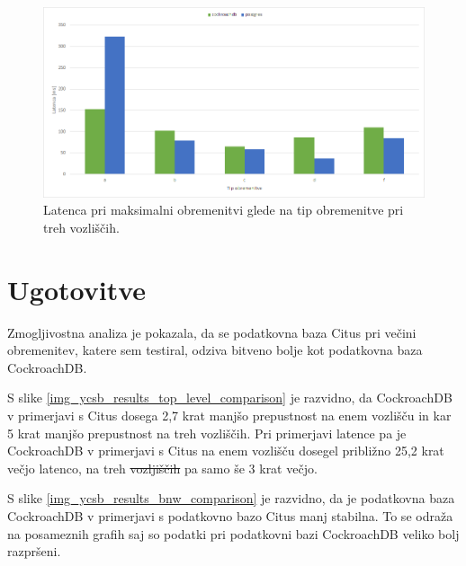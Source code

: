 \documentclass[a4paper, 12pt]{book}
\providecommand{\DIFaddtex}[1]{{\protect\color{blue}\uwave{#1}}} %
\providecommand{\DIFdeltex}[1]{{\protect\color{red}\sout{#1}}}                      %
\providecommand{\DIFaddbegin}{} %
\providecommand{\DIFaddend}{} %
\providecommand{\DIFdelbegin}{} %
\providecommand{\DIFdelend}{} %
\providecommand{\DIFadd}[1]{\texorpdfstring{\DIFaddtex{#1}}{#1}} %
\providecommand{\DIFdel}[1]{\texorpdfstring{\DIFdeltex{#1}}{}} %
\newcommand{\DIFscaledelfig}{0.5}
\newlength{\DIFdelgraphicswidth} %
\newlength{\DIFdelgraphicsheight} %
\newcommand{\DIFaddincludegraphics}[2][]{{\color{blue}\fbox{\DIFOincludegraphics[#1]{#2}}}} %
\newcommand{\DIFdelincludegraphics}[2][]{%
\sbox{\DIFdelgraphicsbox}{\DIFOincludegraphics[#1]{#2}}%
\settoboxwidth{\DIFdelgraphicswidth}{\DIFdelgraphicsbox} %
\settoboxtotalheight{\DIFdelgraphicsheight}{\DIFdelgraphicsbox} %
\scalebox{\DIFscaledelfig}{%
\parbox[b]{\DIFdelgraphicswidth}{\usebox{\DIFdelgraphicsbox}\\[-\baselineskip] \rule{\DIFdelgraphicswidth}{0em}}\llap{\resizebox{\DIFdelgraphicswidth}{\DIFdelgraphicsheight}{%
\setlength{\unitlength}{\DIFdelgraphicswidth}%
\begin{picture}(1,1)%
\thicklines\linethickness{2pt} %
{\color[rgb]{1,0,0}\put(0,0){\framebox(1,1){}}}%
{\color[rgb]{1,0,0}\put(0,0){\line( 1,1){1}}}%
{\color[rgb]{1,0,0}\put(0,1){\line(1,-1){1}}}%
\end{picture}%
}\hspace*{3pt}}} %
} %
\DeclareRobustCommand{\DIFaddbegin}{\DIFOaddbegin \let\includegraphics\DIFaddincludegraphics} %
\DeclareRobustCommand{\DIFaddend}{\DIFOaddend \let\includegraphics\DIFOincludegraphics} %
\DeclareRobustCommand{\DIFdelbegin}{\DIFOdelbegin \let\includegraphics\DIFdelincludegraphics} %
\DeclareRobustCommand{\DIFdelend}{\DIFOaddend \let\includegraphics\DIFOincludegraphics} %
\begin{document}
\begin{figure}[H]
\begin{center}
\includegraphics[width=1\textwidth]{resources/maxThroughput-latency-n3-v2.png}
\end{center}
\caption{Latenca pri maksimalni obremenitvi glede na tip obremenitve pri treh vozliščih.}
\label{img_ycsb_results_max_throughput_latency_n3}
\end{figure}

\section{Ugotovitve}
Zmogljivostna analiza je pokazala, da se podatkovna baza Citus pri večini obremenitev, katere sem testiral, odziva bitveno bolje kot podatkovna baza CockroachDB.

S slike \ref{img_ycsb_results_top_level_comparison} je razvidno, da CockroachDB v primerjavi s Citus dosega 2,7 krat manjšo prepustnost na enem vozlišču in kar 5 krat manjšo prepustnost na treh vozliščih. Pri primerjavi latence pa je CockroachDB v primerjavi s Citus na enem vozlišču dosegel približno 25,2 krat večjo latenco, na treh \DIFdelbegin \DIFdel{vozljiščih }\DIFdelend \DIFaddbegin \DIFadd{vozliščih }\DIFaddend pa samo še 3 krat večjo.

S slike \ref{img_ycsb_results_bnw_comparison} je razvidno, da je podatkovna baza CockroachDB v primerjavi s podatkovno bazo Citus manj stabilna. To se odraža na posameznih grafih saj so podatki pri podatkovni bazi CockroachDB veliko bolj razpršeni.


\end{document}
